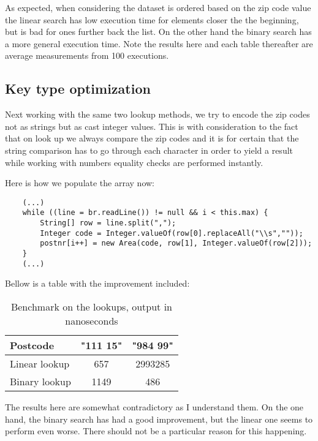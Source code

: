 \documentclass[a4paper,11pt]{article}
\begin{document}
As expected, when considering the dataset is ordered based on the zip code value the linear search has low execution time for elements closer the the beginning, but is bad for ones further back the list. On the other hand the binary search has a more general execution time. Note the results here and each table thereafter are average measurements from 100 executions.
\subsection*{Key type optimization}
Next working with the same two lookup methods, we try to encode the zip codes not as strings but as cast integer values. This is with consideration to the fact that on look up we always compare the zip codes and it is for certain that the string comparison has to go through each character in order to yield a result while working with numbers equality checks are performed instantly.

Here is how we populate the array now:

\begin{verbatim}
    (...)
    while ((line = br.readLine()) != null && i < this.max) {
        String[] row = line.split(",");
        Integer code = Integer.valueOf(row[0].replaceAll("\\s",""));
        postnr[i++] = new Area(code, row[1], Integer.valueOf(row[2]));
    }
    (...)
\end{verbatim}

Bellow is a table with the improvement included:

\begin{table}[H]
\begin{center}
\begin{tabular}{l|c|c}
\textbf{Postcode} & \textbf{"111 15"} & \textbf{"984 99"}\\
\hline
  Linear lookup      &  657 &     2993285 \\
  Binary lookup       &  1149 &    486 \\
\end{tabular}
\caption{Benchmark on the lookups, output in nanoseconds}
\label{tab:table1}
\end{center}
\end{table}

The results here are somewhat contradictory as I understand them. On the one hand, the binary search has had a good improvement, but the linear one seems to perform even worse. There should not be a particular reason for this happening.
\end{document}
